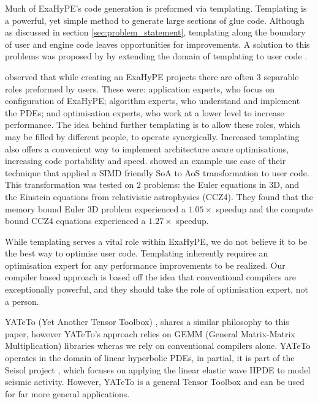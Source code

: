 


Much of ExaHyPE's code generation is preformed via templating.
Templating is a powerful, yet simple method to generate large sections of glue code.
Although as discussed in section \ref{sec:problem_statement}, templating along the boundary of user and engine code leaves opportunities for improvements.  
A solution to this problems was proposed by \citeauthor{templateExahype} by extending the domain of templating to user code \cite{templateExahype}.

\citeauthor{templateExahype} observed that while creating an ExaHyPE projects there are often 3 separable roles preformed by users.
These were: application experts, who focus on configuration of ExaHyPE; algorithm experts, who understand and implement the PDEs; and optimisation experts, who work at a lower level to increase performance.
The idea behind further templating is to allow these roles, which may be filled by different people, to operate synergically.
Increased templating also offers a convenient way to implement architecture aware optimisations, increasing code portability and speed.
\citeauthor{templateExahype} showed an example use case of their technique that applied a SIMD friendly SoA to AoS transformation to user code.
This transformation was tested on 2 problems: the Euler equations in 3D, and the Einstein equations from relativistic astrophysics (CCZ4).
They found that the memory bound Euler 3D problem experienced a $1.05\times$ speedup and the compute bound CCZ4 equations experienced a $1.27\times$ speedup.

While templating serves a vital role within ExaHyPE, we do not believe it to be the best way to optimise user code.
Templating inherently requires an optimisation expert for any performance improvements to be realized.
Our compiler based approach is based off the idea that conventional compilers are exceptionally powerful, and they should take the role of optimisation expert, not a person. 



YATeTo (Yet Another Tensor Toolbox) \cite{YATeTo}, shares a similar philosophy to this paper, however YATeTo's approach relies on GEMM (General Matrix-Matrix Multiplication) libraries wheras we rely on conventional compilers alone.
YATeTo operates in the domain of linear hyperbolic PDEs, in partial, it is part of the Seisol project \cite{seisolPFLOP}, which focuses on applying the linear elastic wave HPDE to model seismic activity.
However, YATeTo is a general Tensor Toolbox and can be used for far more general applications.

